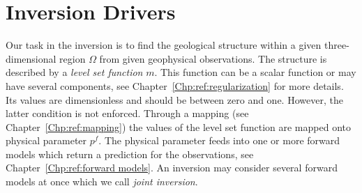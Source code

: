 \chapter{Inversion Drivers}\label{chapter:ref:Drivers}

Our task in the inversion is to find the geological structure within a given three-dimensional region $\Omega$ from given geophysical 
observations. 
The structure is described by a \emph{level set function} $m$.
This function can be a scalar function or may have several components,
see Chapter~\ref{Chp:ref:regularization} for more details.
Its values are dimensionless and should be between zero and one.
However, the latter condition is not enforced.
Through a mapping (see Chapter~\ref{Chp:ref:mapping}) the values
of the level set function are mapped onto physical parameter $p^f$.
The physical parameter feeds into one or more forward models
which return a prediction for the observations, see Chapter~\ref{Chp:ref:forward models}.
An inversion may consider several forward models at once which we call
\emph{joint inversion}.


